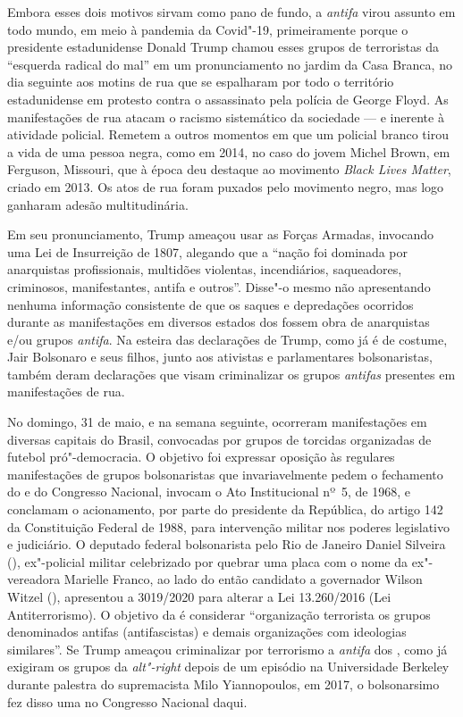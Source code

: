 Embora esses dois motivos sirvam como pano de fundo, a \emph{antifa}
virou assunto em todo mundo, em meio à pandemia da Covid"-19,
primeiramente porque o presidente estadunidense Donald Trump chamou
esses grupos de terroristas da ``esquerda radical do mal'' em um
pronunciamento no jardim da Casa Branca, no dia seguinte aos motins de
rua que se espalharam por todo o território estadunidense em protesto
contra o assassinato pela polícia
de George Floyd. As manifestações de rua atacam o racismo sistemático da
sociedade --- e inerente à atividade policial. Remetem a outros momentos em
que um policial branco tirou a vida de uma pessoa negra, como em 2014,
no caso do jovem Michel Brown, em Ferguson, Missouri, que
à época deu destaque ao movimento \emph{Black Lives Matter}, criado em
2013. Os atos de rua foram puxados pelo movimento negro, mas logo
ganharam adesão multitudinária.

Em seu pronunciamento, Trump ameaçou usar as Forças Armadas,
invocando uma Lei de Insurreição de 1807, alegando que a ``nação foi
dominada por anarquistas profissionais, multidões violentas,
incendiários, saqueadores, criminosos, manifestantes, antifa e outros''.
Disse"-o mesmo não apresentando nenhuma informação consistente de que os
saques e depredações ocorridos durante as manifestações em diversos
estados dos  fossem obra de anarquistas e/ou grupos \emph{antifa}. Na
esteira das declarações de Trump, como já é de costume, Jair Bolsonaro e
seus filhos, junto aos ativistas e parlamentares bolsonaristas, também
deram declarações que visam criminalizar os grupos \emph{antifas}
presentes em manifestações de rua.

No domingo, 31 de maio, e na semana seguinte, ocorreram manifestações em
diversas capitais do Brasil, convocadas por grupos de torcidas organizadas
de futebol pró"-democracia. O objetivo foi expressar
oposição às regulares manifestações de grupos bolsonaristas que
invariavelmente pedem o fechamento do  e do Congresso Nacional,
invocam o Ato Institucional nº~5, de 1968, e conclamam o acionamento,
por parte do presidente da República, do artigo 142 da Constituição
Federal de 1988, para intervenção militar nos poderes legislativo e
judiciário. O deputado federal bolsonarista pelo Rio de Janeiro Daniel
Silveira (), ex"-policial militar celebrizado por quebrar uma placa
com o nome da ex"-vereadora Marielle Franco,
ao lado do então candidato a governador Wilson Witzel (), apresentou a 
3019/2020 para alterar a Lei 13.260/2016 (Lei Antiterrorismo). O
objetivo da  é considerar ``organização terrorista os grupos
denominados antifas (antifascistas) e demais organizações com ideologias
similares''. Se Trump ameaçou criminalizar por terrorismo a
\emph{antifa} dos , como já exigiram os grupos da \emph{alt"-right}
depois de um episódio na Universidade Berkeley durante palestra do
supremacista Milo Yiannopoulos, em 2017, o bolsonarsimo fez disso uma 
no Congresso Nacional daqui.

